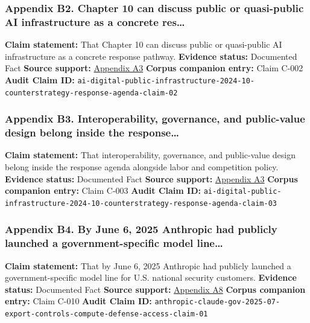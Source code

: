 \documentclass[
  american,
  11pt,
  letterpaper,
]{article}
\begin{document}
\subsubsection{Appendix B2. Chapter 10 can discuss public or
quasi-public AI infrastructure as a concrete
res\ldots{}}\label{appendix-b2-chapter-10-can-discuss-public-or-quasi-public-ai-infrastructure-as-a-concrete-res}

\textbf{Claim statement:} That Chapter 10 can discuss public or
quasi-public AI infrastructure as a concrete response pathway.
\textbf{Evidence status:} Documented Fact \textbf{Source support:}
\hyperref[appendix-a3-interactions-between-artificial-intelligence-and-digital-public-infrastructure-concepts-benefits-and-challenges]{Appendix
A3} \textbf{Corpus companion entry:} Claim C-002 \textbf{Audit Claim
ID:}
\texttt{ai-digital-public-infrastructure-2024-10-counterstrategy-response-agenda-claim-02}

\subsubsection{Appendix B3. Interoperability, governance, and
public-value design belong inside the
response\ldots{}}\label{appendix-b3-interoperability-governance-and-public-value-design-belong-inside-the-response}

\textbf{Claim statement:} That interoperability, governance, and
public-value design belong inside the response agenda alongside labor
and competition policy. \textbf{Evidence status:} Documented Fact
\textbf{Source support:}
\hyperref[appendix-a3-interactions-between-artificial-intelligence-and-digital-public-infrastructure-concepts-benefits-and-challenges]{Appendix
A3} \textbf{Corpus companion entry:} Claim C-003 \textbf{Audit Claim
ID:}
\texttt{ai-digital-public-infrastructure-2024-10-counterstrategy-response-agenda-claim-03}

\subsubsection{Appendix B4. By June 6, 2025 Anthropic had publicly
launched a government-specific model
line\ldots{}}\label{appendix-b4-by-june-6-2025-anthropic-had-publicly-launched-a-government-specific-model-line}

\textbf{Claim statement:} That by June 6, 2025 Anthropic had publicly
launched a government-specific model line for U.S. national security
customers. \textbf{Evidence status:} Documented Fact \textbf{Source
support:}
\hyperref[appendix-a8-claude-gov-models-for-u-s-national-security-customers]{Appendix
A8} \textbf{Corpus companion entry:} Claim C-010 \textbf{Audit Claim
ID:}
\texttt{anthropic-claude-gov-2025-07-export-controls-compute-defense-access-claim-01}
\end{document}
